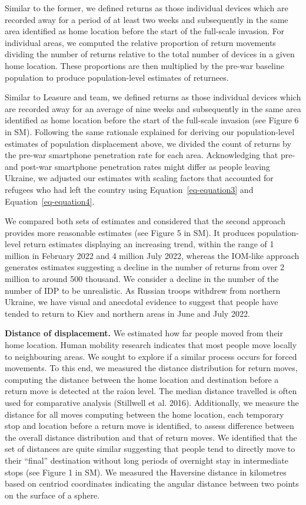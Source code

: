 \documentclass[
  sn-nature,
  11pt,
]{sn-jnl}
\begin{document}
Similar to the former, we defined returns as those individual devices
which are recorded away for a period of at least two weeks and
subsequently in the same area identified as home location before the
start of the full-scale invasion. For individual areas, we computed the
relative proportion of return movements dividing the number of returns
relative to the total number of devices in a given home location. These
proportions are then multiplied by the pre-war baseline population to
produce population-level estimates of returnees.

Similar to Leasure and team, we defined returns as those individual
devices which are recorded away for an average of nine weeks and
subsequently in the same area identified as home location before the
start of the full-scale invasion (see Figure 6 in SM). Following the
same rationale explained for deriving our population-level estimates of
population displacement above, we divided the count of returns by the
pre-war smartphone penetration rate for each area. Acknowledging that
pre- and post-war smartphone penetration rates might differ as people
leaving Ukraine, we adjusted our estimates with scaling factors that
accounted for refugees who had left the country using
Equation~\ref{eq-equation3} and Equation~\ref{eq-equation4}.

We compared both sets of estimates and considered that the second
approach provides more reasonable estimates (see Figure 5 in SM). It
produces population-level return estimates displaying an increasing
trend, within the range of 1 million in February 2022 and 4 million July
2022, whereas the IOM-like approach generates estimates suggesting a
decline in the number of returns from over 2 million to around 500
thousand. We consider a decline in the number of the number of IDP to be
unrealistic. As Russian troops withdrew from northern Ukraine, we have
visual and anecdotal evidence to suggest that people have tended to
return to Kiev and northern areas in June and July 2022.

\textbf{Distance of displacement.} We estimated how far people moved
from their home location. Human mobility research indicates that most
people move locally to neighbouring areas. We sought to explore if a
similar process occurs for forced movements. To this end, we measured
the distance distribution for return moves, computing the distance
between the home location and destination before a return move is
detected at the raion level. The median distance travelled is often used
for comparative analysis (Stillwell et al. 2016). Additionally, we
measure the distance for all moves computing between the home location,
each temporary stop and location before a return move is identified, to
assess difference between the overall distance distribution and that of
return moves. We identified that the set of distances are quite similar
suggesting that people tend to directly move to their ``final''
destination without long periods of overnight stay in intermediate stops
(see Figure 1 in SM). We measured the Haversine distance in kilometres
based on centriod coordinates indicating the angular distance between
two points on the surface of a sphere.
\end{document}
